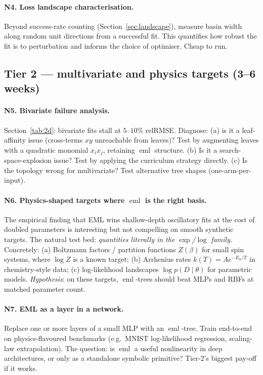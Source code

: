 \documentclass[11pt]{article}
\newcommand{\eml}{\operatorname{eml}}
\begin{document}
\paragraph{N4. Loss landscape characterisation.}
Beyond success-rate counting (Section~\ref{sec:landscape}), measure
basin width along random unit directions from a successful fit. This
quantifies how robust the fit is to perturbation and informs the choice of
optimiser. Cheap to run.

\subsection{Tier 2 — multivariate and physics targets (3--6 weeks)}

\paragraph{N5. Bivariate failure analysis.}
Section~\ref{tab:2d}: bivariate fits stall at $5$--$10\%$ relRMSE. Diagnose:
(a) is it a leaf-affinity issue (cross-terms $xy$ unreachable from leaves)?
Test by augmenting leaves with a quadratic monomial $x_i x_j$, retaining
$\eml$ structure. (b) Is it a search-space-explosion issue? Test by
applying the curriculum strategy directly. (c) Is the topology wrong for
multivariate? Test alternative tree shapes (one-arm-per-input).

\paragraph{N6. Physics-shaped targets where $\eml$ is the right basis.}
The empirical finding that EML wins shallow-depth oscillatory fits at the
cost of doubled parameters is interesting but not compelling on smooth
synthetic targets. The natural test bed:
\emph{quantities literally in the $\exp$/$\log$ family}.
Concretely: (a) Boltzmann factors / partition functions $Z(\beta)$
for small spin systems, where $\log Z$ is a known target;
(b) Arrhenius rates $k(T) = A e^{-E_a / T}$ in chemistry-style data;
(c) log-likelihood landscapes $\log p(D \mid \theta)$ for parametric
models. \emph{Hypothesis}: on these targets, $\eml$-trees should beat
MLPs and RBFs at matched parameter count.

\paragraph{N7. EML as a layer in a network.}
Replace one or more layers of a small MLP with an $\eml$-tree. Train
end-to-end on physics-flavoured benchmarks (e.g.\ MNIST log-likelihood
regression, scaling-law extrapolation). The question: is $\eml$ a
useful nonlinearity in deep architectures, or only as a standalone
symbolic primitive? Tier-2's biggest pay-off if it works.
\end{document}
